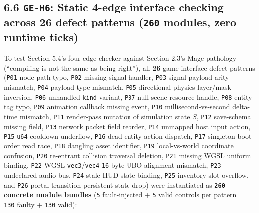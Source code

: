 \documentclass[10pt,letterpaper]{article}
\begin{document}
\subsection{\texorpdfstring{6.6 \texttt{GE-H6}: Static 4-edge interface
checking across 26 defect patterns (\texttt{260} modules, zero runtime
ticks)}{6.6 GE-H6: Static 4-edge interface checking across 26 defect patterns (260 modules, zero runtime ticks)}}\label{ge-h6-static-4-edge-interface-checking-across-26-defect-patterns-260-modules-zero-runtime-ticks}

To test Section 5.4's four-edge checker against Section 2.3's Mage
pathology (``compiling is not the same as being right''), all
\textbf{26} game-interface defect patterns (\texttt{P01} node-path typo,
\texttt{P02} missing signal handler, \texttt{P03} signal payload arity
mismatch, \texttt{P04} payload type mismatch, \texttt{P05} directional
physics layer/mask inversion, \texttt{P06} unhandled \texttt{kind}
variant, \texttt{P07} null scene resource handle, \texttt{P08} entity
tag typo, \texttt{P09} animation callback missing event, \texttt{P10}
millisecond-vs-second delta-time mismatch, \texttt{P11} render-pass
mutation of simulation state \(S\), \texttt{P12} save-schema missing
field, \texttt{P13} network packet field reorder, \texttt{P14} unmapped
host input action, \texttt{P15} \texttt{u64} cooldown underflow,
\texttt{P16} dead-entity action dispatch, \texttt{P17} singleton
boot-order read race, \texttt{P18} dangling asset identifier,
\texttt{P19} local-vs-world coordinate confusion, \texttt{P20}
re-entrant collision traversal deletion, \texttt{P21} missing WGSL
uniform binding, \texttt{P22} WGSL \texttt{vec3}/\allowbreak{}\texttt{vec4}
\texttt{16}-byte UBO alignment mismatch, \texttt{P23} undeclared audio
bus, \texttt{P24} stale HUD state binding, \texttt{P25} inventory slot
overflow, and \texttt{P26} portal transition persistent-state drop) were
instantiated as \textbf{\texttt{260} concrete module bundles}
(\texttt{5} fault-injected + \texttt{5} valid controls per pattern =
\texttt{130} faulty + \texttt{130} valid):
\end{document}
